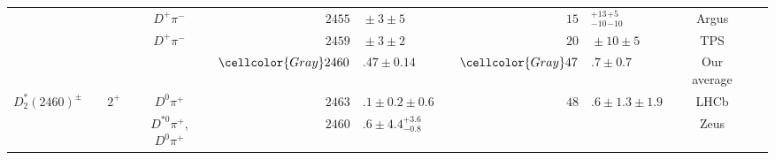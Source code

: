 \begin{adjustbox}{width=0.76\textwidth,center}
{\begin{tabular}{cp{5pt}cp{5pt}cp{5pt}r@{}lp{5pt}r@{}lp{5pt}cp{5pt}c}
		                                         &                  &                              &                  & $D^{+}\pi^{-}$                  &                       & $	2455$                       & ${}\pm3\pm5	$                                 &                       & $	15$                                            & ${}^{+13}_{-10}{}^{+5}_{-10}	$               &                       & Argus                                                         &                       & \cite{Albrecht:1988dj}                    \\
		                                         &                  &                              &                  & $D^{+}\pi^{-}$                  &                       & $ 2459$                       & ${}\pm3\pm2$                                  &                       & $ 20$                                            & ${}\pm10\pm5$                                &                       & TPS                                                           &                       & \cite{Anjos:1988uf}                       \\	 \cmidrule{6-14}															
		\cmidrule{6-14}												
		                                         &                  &                              &                  &                                 & \cellcolor{Gray}      & $	\cellcolor{Gray} 2460$      & \cellcolor{Gray}$.47 \pm 0.14	$               & \cellcolor{Gray}      & $	\cellcolor{Gray} 47$                           & \cellcolor{Gray}$.7 \pm 0.7	$                & \cellcolor{Gray}      & \cellcolor{Gray} Our average                                  & \cellcolor{Gray}      &                                           \\ \midrule
		\multirow{9}{*}{$D_{2}^{*}(2460)^{\pm}$} &                  & \multirow{9}{*}{$2^{+}$}     &                  & $D^{0}\pi^{+}$                  &                       & $	2463$                       & $.1\pm0.2\pm0.6	$                             &                       & $	48$                                            & $.6\pm1.3\pm1.9	$                            &                       & LHCb                                                          &                       & \cite{Aaij:2013sza}                       \\
		                                         &                  &                              &                  & $D^{*0}\pi^{+}$, $D^{0}\pi^{+}$ &                       & $	2460$                       & $.6\pm4.4^{+3.6}_{-0.8}	$                     &                       &                                                  &                                              &                       & Zeus                                                          &                       & \cite{Abramowicz:2012ys}                  \\

\end{tabular}}
\end{adjustbox}
